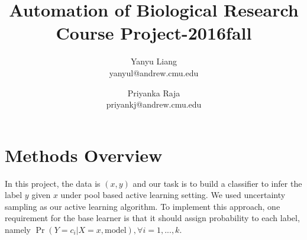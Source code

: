 \documentclass{article}
\begin{document}
\title{Automation of Biological Research Course Project-2016fall}
\author{Yanyu Liang \\ yanyul@andrew.cmu.edu \and Priyanka Raja \\ priyankj@andrew.cmu.edu}

\maketitle



\section{Methods Overview}


In this project, the data is $(x, y)$ and our task is to build a classifier to infer the label $y$ given $x$ under pool based active learning setting. We used uncertainty sampling as our active learning algorithm. To implement this approach, one requirement for the base learner is that it should assign probability to each label, namely $\Pr(Y = c_i|X = x, \text{model}), \forall i = 1, ..., k$.
\end{document}
